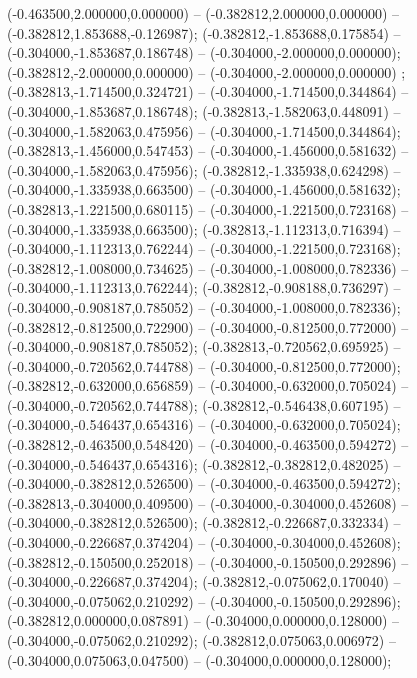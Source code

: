  (-0.463500,2.000000,0.000000) -- (-0.382812,2.000000,0.000000) -- (-0.382812,1.853688,-0.126987);
 (-0.382812,-1.853688,0.175854) -- (-0.304000,-1.853687,0.186748) -- (-0.304000,-2.000000,0.000000);
 (-0.382812,-2.000000,0.000000) -- (-0.304000,-2.000000,0.000000) ;
 (-0.382813,-1.714500,0.324721) -- (-0.304000,-1.714500,0.344864) -- (-0.304000,-1.853687,0.186748);
 (-0.382813,-1.582063,0.448091) -- (-0.304000,-1.582063,0.475956) -- (-0.304000,-1.714500,0.344864);
 (-0.382813,-1.456000,0.547453) -- (-0.304000,-1.456000,0.581632) -- (-0.304000,-1.582063,0.475956);
 (-0.382812,-1.335938,0.624298) -- (-0.304000,-1.335938,0.663500) -- (-0.304000,-1.456000,0.581632);
 (-0.382813,-1.221500,0.680115) -- (-0.304000,-1.221500,0.723168) -- (-0.304000,-1.335938,0.663500);
 (-0.382813,-1.112313,0.716394) -- (-0.304000,-1.112313,0.762244) -- (-0.304000,-1.221500,0.723168);
 (-0.382812,-1.008000,0.734625) -- (-0.304000,-1.008000,0.782336) -- (-0.304000,-1.112313,0.762244);
 (-0.382812,-0.908188,0.736297) -- (-0.304000,-0.908187,0.785052) -- (-0.304000,-1.008000,0.782336);
 (-0.382812,-0.812500,0.722900) -- (-0.304000,-0.812500,0.772000) -- (-0.304000,-0.908187,0.785052);
 (-0.382813,-0.720562,0.695925) -- (-0.304000,-0.720562,0.744788) -- (-0.304000,-0.812500,0.772000);
 (-0.382812,-0.632000,0.656859) -- (-0.304000,-0.632000,0.705024) -- (-0.304000,-0.720562,0.744788);
 (-0.382812,-0.546438,0.607195) -- (-0.304000,-0.546437,0.654316) -- (-0.304000,-0.632000,0.705024);
 (-0.382812,-0.463500,0.548420) -- (-0.304000,-0.463500,0.594272) -- (-0.304000,-0.546437,0.654316);
 (-0.382812,-0.382812,0.482025) -- (-0.304000,-0.382812,0.526500) -- (-0.304000,-0.463500,0.594272);
 (-0.382813,-0.304000,0.409500) -- (-0.304000,-0.304000,0.452608) -- (-0.304000,-0.382812,0.526500);
 (-0.382812,-0.226687,0.332334) -- (-0.304000,-0.226687,0.374204) -- (-0.304000,-0.304000,0.452608);
 (-0.382812,-0.150500,0.252018) -- (-0.304000,-0.150500,0.292896) -- (-0.304000,-0.226687,0.374204);
 (-0.382812,-0.075062,0.170040) -- (-0.304000,-0.075062,0.210292) -- (-0.304000,-0.150500,0.292896);
 (-0.382812,0.000000,0.087891) -- (-0.304000,0.000000,0.128000) -- (-0.304000,-0.075062,0.210292);
 (-0.382812,0.075063,0.006972) -- (-0.304000,0.075063,0.047500) -- (-0.304000,0.000000,0.128000);
